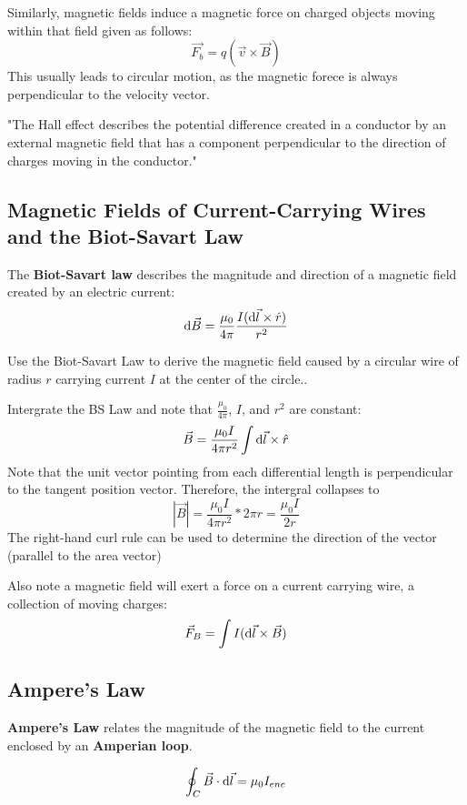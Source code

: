 \documentclass{article}
\begin{document}
Similarly, magnetic fields induce a magnetic force on charged objects moving within that field given as follows:
\[\vec{F_b} = q(\vec{v} \times \vec{B})\]
This usually leads to circular motion, as the magnetic forece is always perpendicular to the velocity vector.

"The Hall effect describes the potential difference created in a conductor by an external magnetic field that has a component perpendicular to the direction of charges moving in the conductor."

\subsection{Magnetic Fields of Current-Carrying Wires and the Biot-Savart Law}
The \textbf{Biot-Savart law} describes the magnitude and direction of a magnetic field created by an electric current:
\[\odif{\vec{B}} = \frac{\mu_0}{4\pi} \frac{I(\odif{\vec{l}} \times \hat{r})}{r^2}\]

\begin{example}
    Use the Biot-Savart Law to derive the magnetic field caused by a circular wire of radius $r$ carrying current $I$ at the center of the circle..
\end{example}
\begin{answer}
    Intergrate the BS Law and note that $\frac{\mu_0}{4\pi}$, $I$, and $r^2$ are constant:
    \[\vec{B} = \frac{\mu_0 I}{4\pi r^2} \int \odif{\vec{l}} \times \hat{r}\]
    Note that the unit vector pointing from each differential length is perpendicular to the tangent position vector.
    Therefore, the intergral collapses to
    \[|\vec{B}| = \frac{\mu_0 I}{4 \pi r^2} * 2 \pi r = \boxed{\frac{\mu_0 I}{2r}}\] 
    The right-hand curl rule can be used to determine the direction of the vector (parallel to the area vector)
\end{answer}

Also note a magnetic field will exert a force on a current carrying wire, a collection of moving charges:
\[\vec{F}_B = \int I(\odif{\vec{l}} \times \vec{B})\]

\subsection{Ampere's Law}

\textbf{Ampere's Law} relates the magnitude of the magnetic field to the current enclosed by an \textbf{Amperian loop}.

\[\oint_{C} \vec{B} \cdot \odif{\vec{l}} = \mu_0 I_{enc}\]
\end{document}
